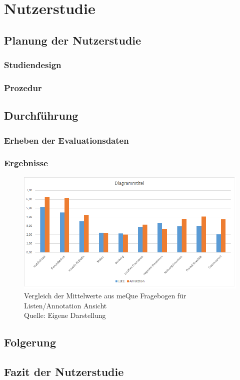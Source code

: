 \chapter{Nutzerstudie}

\section{Planung der Nutzerstudie}

\subsection{Studiendesign}

\subsection{Prozedur}

\section{Durchführung}

\subsection{Erheben der Evaluationsdaten}

\subsection{Ergebnisse}

\begin{figure}[H]
	\centering
	\includegraphics[width=1.0\textwidth]{resources/evaluation/diagrammittel_vergleich_liste_annotation.png}
	\caption{Vergleich der Mittelwerte aus meQue Fragebogen für Listen/Annotation Ansicht \\Quelle: Eigene Darstellung}
	\label{img:avg_meQue_listAnnotation}
\end{figure}

\section{Folgerung}

\section{Fazit der Nutzerstudie}